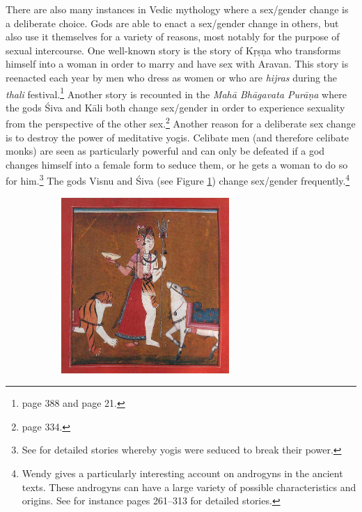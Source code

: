 There are also many instances in Vedic mythology where a sex/gender change is a deliberate choice. Gods are able to enact a sex/gender change in others, but also use it themselves for a variety of reasons, most notably for the purpose of sexual intercourse. One well-known story is the story of Kṛṣṇa who transforms himself into a woman in order to marry and have sex with Aravan. This story is reenacted each year by men who dress as women or who are \textit{hijras} during the \textit{thali} festival.\footnote{\cite{goldman} page 388 and \cite{nanda} page 21.} Another story is recounted in the \textit{Mahā Bhāgavata Purāṇa} where the gods Śiva and Kāli both change sex/gender in order to experience sexuality from the perspective of the other sex.\footnote{\cite{wendy} page 334.} Another reason for a deliberate sex change is to destroy the power of meditative yogis. Celibate men (and therefore celibate monks) are seen as particularly powerful and can only be defeated if a god changes himself into a female form to seduce them, or he gets a woman to do so for him.\footnote{See \cite{wendy1969} for detailed stories whereby yogis were seduced to break their power.} The gods Visnu and Śiva (see Figure \ref{siva}) change sex/gender frequently.\footnote{Wendy \cite{wendy} gives a particularly interesting account on androgyns in the ancient texts. These androgyns can have a large variety of possible characteristics and origins. See for instance pages 261–313 for detailed stories.}

\begin{figure}[!h]
  \begin{subfigure}{\textwidth}
  	\begin{center}
    \includegraphics[width=0.7\textwidth]{androgyne.jpg}
    \end{center}
  \end{subfigure}
  \setcounter{figure}{1}
  \label{siva}
\end{figure}

